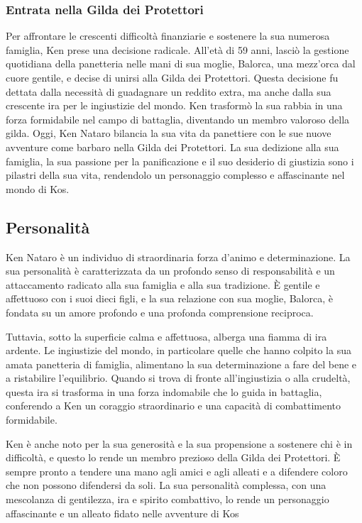 \subsubsection{Entrata nella Gilda dei Protettori}
Per affrontare le crescenti difficoltà finanziarie e sostenere la sua
numerosa famiglia, Ken prese una decisione radicale. All'età di 59 anni,
lasciò la gestione quotidiana della panetteria nelle mani di sua moglie,
Balorca, una mezz'orca dal cuore gentile, e decise di unirsi alla Gilda
dei Protettori. Questa decisione fu dettata dalla necessità di
guadagnare un reddito extra, ma anche dalla sua crescente ira per le
ingiustizie del mondo. Ken trasformò la sua rabbia in una forza
formidabile nel campo di battaglia, diventando un membro valoroso della
gilda. Oggi, Ken Nataro bilancia la sua vita da panettiere con le sue
nuove avventure come barbaro nella Gilda dei Protettori. La sua
dedizione alla sua famiglia, la sua passione per la panificazione e il
suo desiderio di giustizia sono i pilastri della sua vita, rendendolo un
personaggio complesso e affascinante nel mondo di Kos.

\subsection{Personalità}\label{personalituxe0}


Ken Nataro è un individuo di straordinaria forza d'animo e
determinazione. La sua personalità è caratterizzata da un profondo senso
di responsabilità e un attaccamento radicato alla sua famiglia e alla
sua tradizione. È gentile e affettuoso con i suoi dieci figli, e la sua
relazione con sua moglie, Balorca, è fondata su un amore profondo e una
profonda comprensione reciproca.

Tuttavia, sotto la superficie calma e affettuosa, alberga una fiamma di
ira ardente. Le ingiustizie del mondo, in particolare quelle che hanno
colpito la sua amata panetteria di famiglia, alimentano la sua
determinazione a fare del bene e a ristabilire l'equilibrio. Quando si
trova di fronte all'ingiustizia o alla crudeltà, questa ira si trasforma
in una forza indomabile che lo guida in battaglia, conferendo a Ken un
coraggio straordinario e una capacità di combattimento formidabile.

Ken è anche noto per la sua generosità e la sua propensione a sostenere
chi è in difficoltà, e questo lo rende un membro prezioso della Gilda
dei Protettori. È sempre pronto a tendere una mano agli amici e agli
alleati e a difendere coloro che non possono difendersi da soli. La sua
personalità complessa, con una mescolanza di gentilezza, ira e spirito
combattivo, lo rende un personaggio affascinante e un alleato fidato
nelle avventure di Kos

